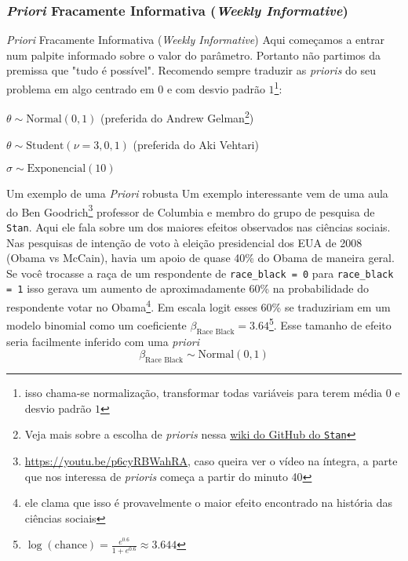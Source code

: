 \subsubsection{\textit{Priori} Fracamente Informativa (\textit{Weekly Informative})}
\begin{frame}{\textit{Priori} Fracamente Informativa (\textit{Weekly Informative})}
    Aqui começamos a entrar num palpite informado sobre o valor do parâmetro.
    Portanto não partimos da premissa que "tudo é possível".
    \vfill
    Recomendo sempre traduzir as \textit{prioris} do seu problema em algo
    centrado em $0$ e com desvio padrão $1$\footnote{isso chama-se normalização,
    transformar todas variáveis para terem média $0$ e desvio padrão $1$}:
    \vfill
    \begin{vfilleditems}
        \item $\theta \sim \text{Normal}(0, 1)$ (preferida do Andrew Gelman\footnote{Veja mais sobre a escolha de \textit{prioris} nessa \href{https://github.com/stan-dev/stan/wiki/Prior-Choice-Recommendations}{wiki do GitHub do \texttt{Stan}}})
        \item $\theta \sim \text{Student}(\nu=3, 0, 1)$ (preferida do Aki Vehtari)
        \item $\sigma \sim \text{Exponencial}(10)$
    \end{vfilleditems}
\end{frame}

\begin{frame}{Um exemplo de uma \textit{Priori} robusta}
    \footnotesize
    Um exemplo interessante vem de uma aula do Ben
    Goodrich\footnote{\url{https://youtu.be/p6cyRBWahRA}, caso queira ver o vídeo na íntegra, a parte que nos interessa de \textit{prioris} começa a partir do minuto 40}
    professor de Columbia e membro do grupo de pesquisa de \texttt{Stan}.
    \vfill
    Aqui ele fala sobre um dos maiores efeitos observados nas ciências sociais.
    Nas pesquisas de intenção de voto à eleição presidencial dos EUA de 2008 (Obama vs McCain),
    havia um apoio de quase 40\% do Obama de maneira geral.
    Se você trocasse a raça de um respondente de \lstinline!race_black = 0!
    para \lstinline!race_black = 1! isso gerava um aumento de aproximadamente 60\%
    na probabilidade do respondente votar no Obama\footnote{ele clama que isso é provavelmente
    o maior efeito encontrado na história das ciências sociais}.
    \vfill
    Em escala logit esses 60\% se
    traduziriam em um modelo binomial como um coeficiente
    $\beta_{\text{Race Black}} = 3.64$\footnote{$\log(\text{chance}) = \frac{e^{0.6}}{1 + e^{0.6}} \approx 3.644$}.
    Esse tamanho de efeito seria facilmente inferido com uma \textit{priori} $$\beta_{\text{Race Black}} \sim \text{Normal}(0, 1)$$
\end{frame}


